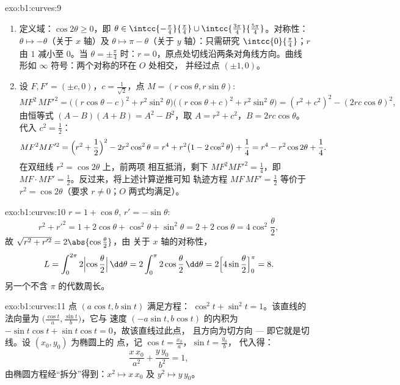 \begin{solution}{exo:b1:curves:9}
\begin{enumerate}
  \item 定义域：$\cos 2\theta \geq 0$，即 $\theta \in
        \intcc{-\frac\pi4}{\frac\pi4} \cup
        \intcc{\frac{3\pi}{4}}{\frac{5\pi}{4}}$。对称性：$\theta
        \mapsto -\theta$（关于 $x$ 轴）及 $\theta \mapsto \pi -
        \theta$（关于 $y$ 轴）：只需研究 $\intcc{0}{\frac\pi4}$；$r$
        由 $1$ 减小至 $0$。当 $\theta = \pm\frac\pi4$ 时：$r =
        0$，原点处切线沿两条对角线方向。曲线
        形如 $\infty$ 符号：两个对称的环在 $O$ 处相交，
        并经过点 $(\pm 1, 0)$。
  \item 设 $F, F' = (\pm c, 0)$，$c = \frac{1}{\sqrt 2}$，点 $M
        = (r\cos\theta, r\sin\theta)$:
        \[
        MF^2\, MF'^2
        = \bigl((r\cos\theta - c)^2 + r^2\sin^2\theta\bigr)
        \bigl((r\cos\theta + c)^2 + r^2\sin^2\theta\bigr)
        = (r^2 + c^2)^2 - (2rc\cos\theta)^2 ,
        \]
        由恒等式 $(A - B)(A + B) = A^2 - B^2$，取 $A = r^2
        + c^2$，$B = 2rc\cos\theta$。代入 $c^2 = \frac12$：
        \[
        MF^2 MF'^2 = \Bigl(r^2 + \frac12\Bigr)^2 - 2r^2\cos^2\theta
        = r^4 + r^2\bigl(1 - 2\cos^2\theta\bigr) + \frac14
        = r^4 - r^2\cos 2\theta + \frac14 .
        \]
        在双纽线 $r^2 = \cos 2\theta$ 上，前两项
        相互抵消，剩下 $MF^2MF'^2 = \frac14$，即\ $MF \cdot MF' =
        \frac12$。反过来，将上述计算逆推可知
        轨迹方程 $MF\,MF' = \frac12$ 等价于 $r^2 = \cos
        2\theta$（要求 $r \neq 0$；$O$ 两式均满足）。
\end{enumerate}
\end{solution}

\begin{solution}{exo:b1:curves:10}
$r = 1 + \cos\theta$, $r' = -\sin\theta$:
\[
r^2 + r'^2 = 1 + 2\cos\theta + \cos^2\theta + \sin^2\theta
= 2 + 2\cos\theta = 4\cos^2\frac\theta2 ,
\]
故 $\sqrt{r^2 + r'^2} = 2\abs{\cos\frac\theta2}$，由
关于 $x$ 轴的对称性，
\[
L = \int_0^{2\pi} 2\Bigl|\cos\frac\theta2\Bigr|\,\dd\theta
= 2\int_0^{\pi} 2\cos\frac\theta2\,\dd\theta
= 2\Bigl[4\sin\frac\theta2\Bigr]_0^{\pi} = 8 .
\]
另一个不含 $\pi$ 的代数周长。
\end{solution}

\begin{solution}{exo:b1:curves:11}
点 $(a\cos t, b\sin t)$ 满足方程：
$\cos^2 t + \sin^2 t = 1$。该直线的法向量为
$\bigl(\frac{\cos t}a, \frac{\sin t}b\bigr)$，它与
速度 $(-a\sin t, b\cos t)$ 的内积为 $-\sin t\cos t +
\sin t\cos t = 0$，故该直线过此点，
且方向为切方向 --- 即它就是切线。设 $(x_0, y_0)$ 为椭圆上的
点，记 $\cos t = \frac{x_0}a$，$\sin t = \frac{y_0}b$，
代入得：
\[
\frac{x\,x_0}{a^2} + \frac{y\,y_0}{b^2} = 1 ,
\]
由椭圆方程经“拆分”得到：$x^2 \mapsto
x\,x_0$ 及 $y^2 \mapsto y\,y_0$。
\end{solution}

